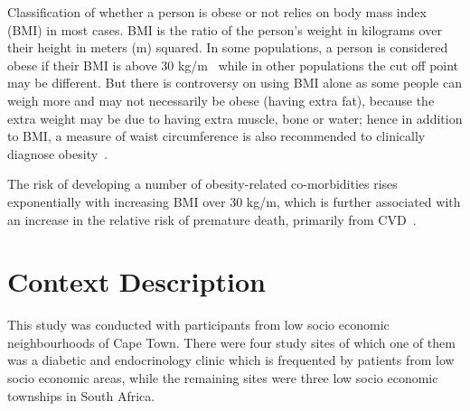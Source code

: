 Classification of whether a person is obese or not relies on body mass index (BMI) in most cases. BMI is the ratio of the person’s weight in kilograms over their height in meters (m) squared. In some populations, a person is considered obese if their BMI is above 30 kg/m~\citep{steyn2006chronic} while in other populations the cut off point may be different. But there is controversy on using BMI alone as some people can weigh more and may not necessarily be obese (having extra fat), because the extra weight may be due to having extra muscle, bone or water; hence in addition to BMI, a measure of waist circumference is also recommended to clinically diagnose obesity~\citep{janssen2004waist}.  

The risk of developing a number of obesity-related co-morbidities rises exponentially with increasing BMI over 30 kg/m, which is further associated with an increase in the relative risk of premature death, primarily from CVD~\citep{de2000clinical}.
 
\section{Context Description}
This study was conducted with participants from low socio economic neighbourhoods of Cape Town. There were four study sites of which one of them was a diabetic and endocrinology clinic which is frequented by patients from low socio economic areas, while the remaining sites were three low socio economic townships in South Africa. 

